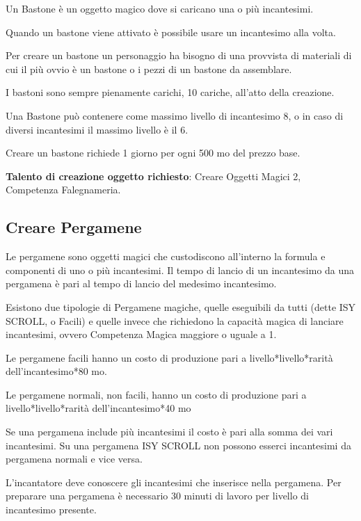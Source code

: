 \begin{multicols}{2}
\bigskip

Un Bastone è un oggetto magico dove si caricano una o più incantesimi.

Quando un bastone viene attivato è possibile usare un incantesimo alla volta.

Per creare un bastone un personaggio ha bisogno di una provvista di materiali di cui il più ovvio è un bastone o i pezzi di un bastone da assemblare.

I bastoni sono sempre pienamente carichi, 10 cariche, all'atto della creazione.

Una Bastone può contenere come massimo livello di incantesimo 8, o in caso di diversi incantesimi il massimo livello è il 6.


Creare un bastone richiede 1 giorno per ogni 500 mo del prezzo base.

\medskip

\textbf{Talento di creazione oggetto richiesto}: Creare Oggetti Magici 2, Competenza Falegnameria.

\subsection{Creare Pergamene}
\label{crearepergamene}\hypertarget{crearepergamene}{}

Le pergamene sono oggetti magici che custodiscono all'interno la formula e componenti di uno o più incantesimi. Il tempo di lancio di un incantesimo da una pergamena è pari al tempo di lancio del medesimo incantesimo.

Esistono due tipologie di Pergamene magiche, quelle eseguibili da tutti (dette ISY SCROLL, o Facili) e quelle invece che richiedono la capacità magica di lanciare incantesimi, ovvero Competenza Magica maggiore o uguale a 1.

Le pergamene facili hanno un costo di produzione pari a livello*livello*rarità dell'incantesimo*80 mo.

Le pergamene normali, non facili, hanno un costo di produzione pari a livello*livello*rarità dell'incantesimo*40 mo

Se una pergamena include più incantesimi il costo è pari alla somma dei vari incantesimi. Su una pergamena ISY SCROLL non possono esserci incantesimi da pergamena normali e vice versa.

L'incantatore deve conoscere gli incantesimi che inserisce nella pergamena. Per preparare una pergamena è necessario 30 minuti di lavoro per livello di incantesimo presente.


\end{multicols}
